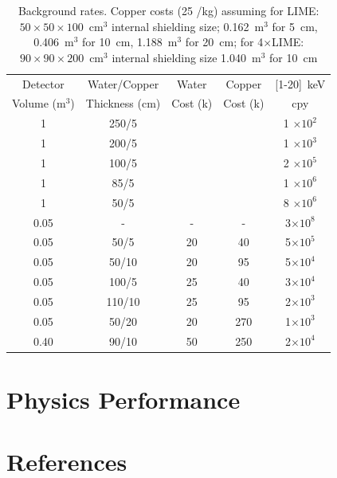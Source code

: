 \documentclass[review]{elsarticle}
\begin{document}
\begin{table}[h!]
\centering
\caption{Background rates. Copper costs (25 \EUR{}/kg) assuming for LIME: $50\times50\times100$~cm$^3$ internal shielding size; 0.162~m$^3$ for 5~cm, 0.406~m$^3$ for 10~cm, 1.188~m$^3$ for 20~cm; 
for 4$\times$LIME: $90\times90\times200$~cm$^3$ internal shielding size 1.040~m$^3$ for 10~cm}
\begin{tabular}{|c|c|c|c|c|} 
 \hline
Detector        & Water/Copper   & Water         &  Copper & [1-20]~keV \\
Volume (m$^3$)  & Thickness (cm) & Cost (k\EUR{})&  Cost (k\EUR{}) & cpy    \\
\hline
\hline
1 & 250/5 & & & 1 $\times 10^{2}$ \\
\hline
1 & 200/5 & & & 1 $\times 10^{3}$ \\
\hline
1 & 100/5 & & & 2 $\times 10^{5}$ \\
\hline
1 & 85/5 & & & 1 $\times 10^{6}$ \\
\hline
1 & 50/5 & & & 8 $\times 10^{6}$ \\
\hline
\hline
0.05 & - & - & - & 3$\times 10^8$ \\
\hline
0.05 & 50/5 & 20 & 40 & 5$\times 10^5$ \\
\hline
0.05 & 50/10 & 20 & 95 & 5$\times 10^4$ \\
\hline
0.05 & 100/5 & 25 & 40 & 3$\times 10^4$ \\
\hline
0.05 & 110/10 & 25 & 95 & 2$\times 10^3$ \\
\hline
0.05 & 50/20 & 20 & 270 & 1$\times 10^3$ \\
\hline
0.40 & 90/10 & 50 & 250 & 2$\times 10^4$ \\
\hline
\hline
\end{tabular}
\label{tab:shield}
\end{table}


\section{Physics Performance}
\section*{References}


\end{document}
